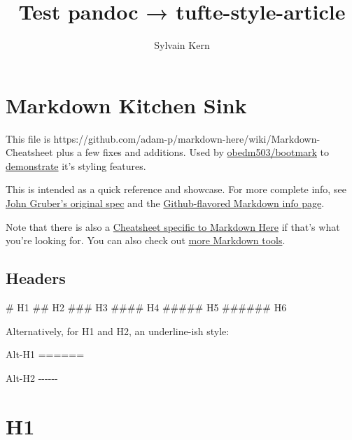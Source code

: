 \documentclass[
]{tufte-pandoc}
\title{Test pandoc → tufte-style-article}
\author{Sylvain Kern}
\date{}
\newenvironment{Shaded}{}{}
\newcommand{\NormalTok}[1]{#1}
\begin{document}
\maketitle


\setcounter{tocdepth}{2}
\tableofcontents

\hypertarget{markdown-kitchen-sink}{%
\section{Markdown Kitchen Sink}\label{markdown-kitchen-sink}}

This file is
https://github.com/adam-p/markdown-here/wiki/Markdown-Cheatsheet plus a
few fixes and additions. Used by
\href{https://github.com/obedm503/bootmark}{obedm503/bootmark} to
\href{https://obedm503.github.io/bootmark/docs/markdown-cheatsheet.html}{demonstrate}
it's styling features.

This is intended as a quick reference and showcase. For more complete
info, see \href{http://daringfireball.net/projects/markdown/}{John
Gruber's original spec} and the
\href{http://github.github.com/github-flavored-markdown/}{Github-flavored
Markdown info page}.

Note that there is also a \href{./Markdown-Here-Cheatsheet}{Cheatsheet
specific to Markdown Here} if that's what you're looking for. You can
also check out \href{./Other-Markdown-Tools}{more Markdown tools}.

\hypertarget{headers}{%
\subsection{Headers}\label{headers}}

\begin{Shaded}
\begin{Highlighting}[]
\NormalTok{\# H1}
\NormalTok{\#\# H2}
\NormalTok{\#\#\# H3}
\NormalTok{\#\#\#\# H4}
\NormalTok{\#\#\#\#\# H5}
\NormalTok{\#\#\#\#\#\# H6}

\NormalTok{Alternatively, for H1 and H2, an underline{-}ish style:}

\NormalTok{Alt{-}H1}
\NormalTok{======}

\NormalTok{Alt{-}H2}
\NormalTok{{-}{-}{-}{-}{-}{-}}
\end{Highlighting}
\end{Shaded}

\hypertarget{h1}{%
\section{H1}\label{h1}}
\end{document}
